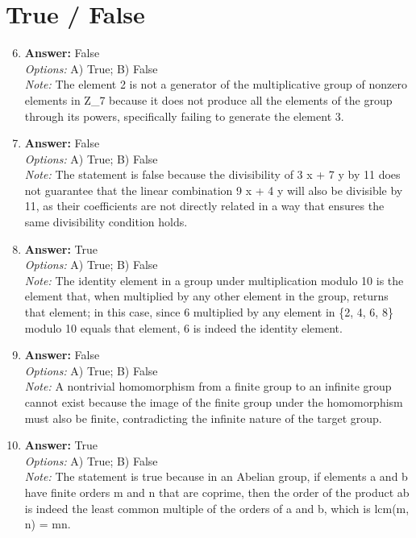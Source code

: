 \documentclass[12pt]{article}
\begin{document}
\section*{True / False}
\begin{enumerate}[label=\arabic*.]
\setcounter{enumi}{5}
\item \textbf{Answer:} False
\\ \textit{Options:} A) True; B) False
\\ \textit{Note:} The element 2 is not a generator of the multiplicative group of nonzero elements in Z\_7 because it does not produce all the elements of the group through its powers, specifically failing to generate the element 3.
\item \textbf{Answer:} False
\\ \textit{Options:} A) True; B) False
\\ \textit{Note:} The statement is false because the divisibility of 3 x + 7 y by 11 does not guarantee that the linear combination 9 x + 4 y will also be divisible by 11, as their coefficients are not directly related in a way that ensures the same divisibility condition holds.
\item \textbf{Answer:} True
\\ \textit{Options:} A) True; B) False
\\ \textit{Note:} The identity element in a group under multiplication modulo 10 is the element that, when multiplied by any other element in the group, returns that element; in this case, since 6 multiplied by any element in \{2, 4, 6, 8\} modulo 10 equals that element, 6 is indeed the identity element.
\item \textbf{Answer:} False
\\ \textit{Options:} A) True; B) False
\\ \textit{Note:} A nontrivial homomorphism from a finite group to an infinite group cannot exist because the image of the finite group under the homomorphism must also be finite, contradicting the infinite nature of the target group.
\item \textbf{Answer:} True
\\ \textit{Options:} A) True; B) False
\\ \textit{Note:} The statement is true because in an Abelian group, if elements a and b have finite orders m and n that are coprime, then the order of the product ab is indeed the least common multiple of the orders of a and b, which is lcm(m, n) = mn.
\end{enumerate}
\end{document}
